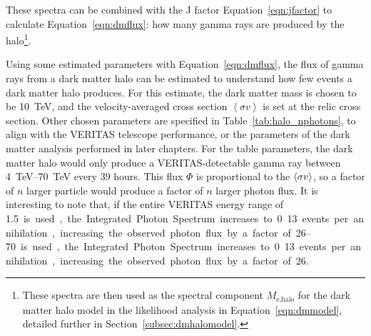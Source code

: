     These spectra can be combined with the J factor Equation~\ref{eqn:jfactor} to calculate Equation~\ref{eqn:dmflux}: how many gamma rays are produced by the halo\footnote{
      These spectra are then used as the spectral component $M_{\textrm{e,halo}}$ for the dark matter halo model in the likelihood analysis in Equation~\ref{eqn:dmmodel}, detailed further in Section~\ref{subsec:dmhalomodel}.
    }.
    
    Using some estimated parameters with Equation~\ref{eqn:dmflux}, the flux of gamma rays from a dark matter halo can be estimated to understand how few events a dark matter halo produces.
    For this estimate, the dark matter mass is chosen to be \SI{10}{TeV}, and the velocity-averaged cross section $\left < \sigma v \right >$ is set at the relic cross section.
    Other chosen parameters are specified in Table~\ref{tab:halo_nphotons}, to align with the VERITAS telescope performance, or the parameters of the dark matter analysis performed in later chapters.
    For the table parameters, the dark matter halo would only produce a VERITAS-detectable gamma ray between \SIrange{4}{70}{TeV} every 39 hours.
    This flux $\Phi$ is proportional to the $\left < \sigma v \right >$, so a factor of $n$ larger particle would produce a factor of $n$ larger photon flux.
    It is interesting to note that, if the entire VERITAS energy range of \SIrange{1.5}{70} is used, the Integrated Photon Spectrum increases to 0.13 events per annihilation, increasing the observed photon flux by a factor of 26.
    
